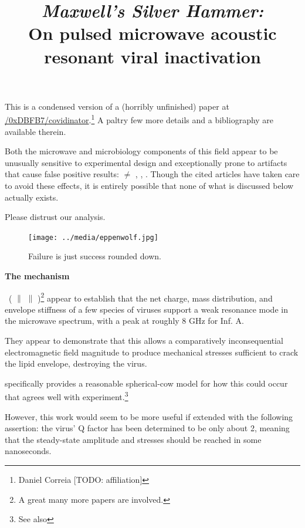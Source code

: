 \documentclass[fleqn,10pt]{paper}
\title{{\it Maxwell's Silver Hammer:}\\ On pulsed microwave acoustic resonant viral inactivation}
\begin{document}
\maketitle


This is a condensed version of a (horribly unfinished) paper at \href{https://www.github.com/0xDBFB7/covidinator/documents/paper.pdf}{\faGithub/0xDBFB7/covidinator}.\footnote{Daniel Correia [TODO: affiliation] } A paltry few more details and a bibliography are available therein.


%



Both the microwave and microbiology components of this field appear to be unusually sensitive to experimental design and exceptionally prone to artifacts that cause false positive results: \cite{Microwave1982} $\neq$ \cite{Resonances1987}, , \cite{Comprehensive2018}. Though the cited articles have taken care to avoid these effects, it is entirely possible that none of what is discussed below actually exists.

Please distrust our analysis.


\begin{figure}[H]
	\texttt{[image: ../media/eppenwolf.jpg]}
	\caption{Failure is just success rounded down.}
\end{figure}


\clearpage

{\Large \textbf{The mechanism}}


\cite{Microwave2009} \textrightarrow \ (\cite{focusing2014} $\parallel$ \cite{Efficient2015} $\parallel$ \cite{Resonant2017})\footnote{A great many more papers are involved.} appear to establish that the net charge, mass distribution, and envelope stiffness of a few species of viruses support a weak resonance mode in the microwave spectrum, with a peak at roughly 8 GHz for Inf. A.

They appear to demonstrate that this allows a comparatively inconsequential electromagnetic field magnitude to produce mechanical stresses sufficient to crack the lipid envelope, destroying the virus.

\cite{Efficient2015} specifically provides a reasonable spherical-cow model for how this could occur that agrees well with experiment.\footnote{See also }

However, this work would seem to be more useful if extended with the following assertion: the virus' Q factor has been determined to be only about 2, meaning that the steady-state amplitude and stresses should be reached in some nanoseconds.
\end{document}
